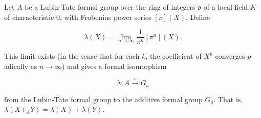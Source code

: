 Let $A$ be a Lubin-Tate formal group over the ring of integers $\mathfrak{o}$ of a local field $K$ of characteristic $0$, with Frobenius power series $[\pi](X)$. Define

$$\lambda(X) = \lim_{n \to \infty} \frac{1}{\pi^n} [\pi^n](X).$$

This limit exists (in the sense that for each $k$, the coefficient of $X^k$ converges $p$-adically as $n \to \infty$) and gives a formal isomorphism

$$\lambda: A \xrightarrow{\sim} G_a$$

from the Lubin-Tate formal group to the additive formal group $G_a$. That is, $\lambda(X +_A Y) = \lambda(X) + \lambda(Y)$.
